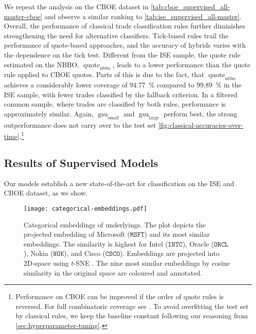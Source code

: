 We repeat the analysis on the \gls{CBOE} dataset in \cref{tab:cboe_supervised_all-master-cboe} and observe a similar ranking to \cref{tab:ise_supervised_all-master}. Overall, the performance of classical trade classification rules further diminishes strengthening the need for alternative classifiers. Tick-based rules trail the performance of quote-based approaches, and the accuracy of hybrids varies with the dependence on the tick test. Different from the \gls{ISE} sample, the quote rule estimated on the \gls{NBBO}, $\operatorname{quote}_{\mathrm{nbbo}}$, leads to a lower performance than the quote rule applied to \gls{CBOE} quotes. Parts of this is due to the fact, that  $\operatorname{quote}_{\mathrm{nbbo}}$ achieves a considerably lower coverage of \SI{94.77}{\percent} compared to \SI{99.89}{\percent} in the \gls{ISE} sample, with fewer trades classified by the fallback criterion. In a filtered common sample, where trades are classified by both rules, performance is approximately similar. Again, $\operatorname{gsu}_{\mathrm{small}}$ and $\operatorname{gsu}_{\mathrm{large}}$ perform best, the strong outperformance does not carry over to the test set \cref{fig:classical-accuracies-over-time}.\footnote{Performance on \gls{CBOE} can be improved if the order of quote rules is reversed. For full combinatoric coverage see \textcite[][33]{grauerOptionTradeClassification2022}. To avoid overfitting the test set by classical rules, we keep the baseline constant following our reasoning from \cref{sec:hyperparameter-tuning}.}


\subsection{Results of Supervised
    Models}\label{sec:results-of-supervised-models}

Our models establish a new state-of-the-art for classification on the \gls{ISE} and \gls{CBOE} dataset, as we show.

\begin{figure}[ht]
    \centering
    \texttt{[image: categorical-embeddings.pdf]}
    \caption[Categorical Embeddings of Underlyings]{Categorical embeddings of underlyings. The plot depicts the projected embedding of Microsoft ($\mathtt{MSFT}$) and its most similar embeddings. The similarity is highest for Intel ($\mathtt{INTC}$), Oracle ($\mathtt{ORCL}$), Nokia ($\mathtt{NOK}$), and Cisco ($\mathtt{CSCO}$). Embeddings are projected into 2D-space using $t$-SNE \autocite{vandermaatenVisualizingDataUsing2008}. The nine most similar embeddings by cosine similarity in the original space are coloured and annotated.}
    \label{fig:categorical-embeddings}
\end{figure}

